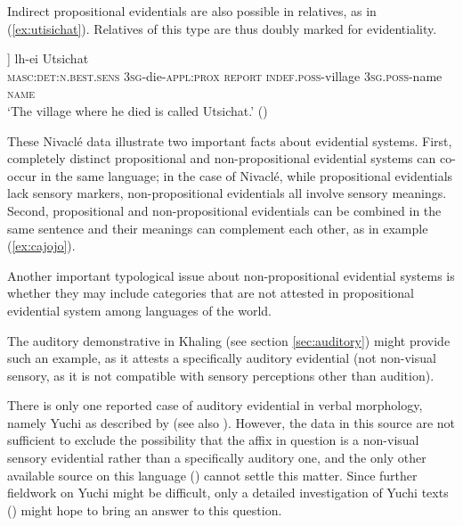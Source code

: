 \documentclass[oneside,a4paper,11pt]{article}
\newcommand{\ipa}[1]{{\phon \mbox{#1}}} %
\begin{document}
Indirect propositional evidentials are also possible in relatives, as in (\ref{ex:utisichat}).  Relatives of this type are thus doubly marked for evidentiality.

\begin{exe}
\ex \label{ex:utisichat}
\gll
[\ipa{pa} 	[\ipa{Ø-vaf-’e} 	\ipa{lhôn}] 	\ipa{yi-tsaat}] 	\ipa{lh-ei} 	\ipa{Utsichat} \\
\textsc{masc:det:n.best.sens} \textsc{3sg}-die-\textsc{appl:prox} \textsc{report} \textsc{indef.poss}-village \textsc{3sg.poss}-name \textsc{name} \\
\glt `The village where he died is called Utsichat.' (\citealt[157]{fabre14nivacle})
\end{exe}

These Nivaclé data illustrate two important facts about evidential systems. First, completely distinct propositional and non-propositional evidential systems can co-occur in the same language; in the case of Nivaclé, while propositional evidentials lack sensory markers, non-propositional evidentials all involve sensory meanings. Second, propositional and non-propositional evidentials can be combined in the same sentence and their meanings can complement each other, as in example (\ref{ex:cajojo}).
 


Another important typological issue about non-propositional evidential systems is whether they may include categories that are not attested in propositional evidential system among languages of the world.

The auditory demonstrative in Khaling (see section \ref{sec:auditory}) might provide such an example, as it attests a specifically auditory evidential (not non-visual sensory, as it is not compatible with sensory perceptions other than audition).

   There is only one reported case of auditory evidential in verbal morphology, namely  Yuchi as described by \citet{linn01euchee} (see also \citealt[37]{aikhenvald06}). However, the data in this source are not sufficient to exclude the possibility that the affix in question is a non-visual sensory evidential rather than a specifically auditory one, and the only other available source on this language (\citealt{wagner38yuchi}) cannot settle this matter. Since further fieldwork on Yuchi might be difficult, only a detailed investigation of Yuchi texts (\citealt{wagner31tales}) might hope to bring an answer to this question.
\end{document}
